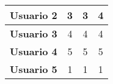 \begin{table}[H]
{\begin{tabular}{c|ccc|}
            \multicolumn{1}{|c|}{\textbf{Usuario 2}} & \multicolumn{1}{c|}{3}                                                                                                                                                       & \multicolumn{1}{c|}{3}                                                                                                                                                                                & 4                                                                                                                                                                                                                    \\ \hline
            \multicolumn{1}{|c|}{\textbf{Usuario 3}} & \multicolumn{1}{c|}{4}                                                                                                                                                       & \multicolumn{1}{c|}{4}                                                                                                                                                                                & 4                                                                                                                                                                                                                    \\ \hline
            \multicolumn{1}{|c|}{\textbf{Usuario 4}} & \multicolumn{1}{c|}{5}                                                                                                                                                       & \multicolumn{1}{c|}{5}                                                                                                                                                                                & 5                                                                                                                                                                                                                    \\ \hline
            \multicolumn{1}{|c|}{\textbf{Usuario 5}} & \multicolumn{1}{c|}{1}                                                                                                                                                       & \multicolumn{1}{c|}{1}                                                                                                                                                                                & 1                                                                                                                                                                                                                    \\ \hline

\end{tabular}}
\end{table}
